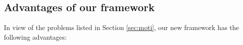 \documentclass[10pt,journal,compsoc]{IEEEtran}
\begin{document}






\subsection{Advantages of our framework}\label{sec:app:advan}
In view of the problems listed in Section \ref{sec:moti},  our new framework has the following advantages:
\end{document}
